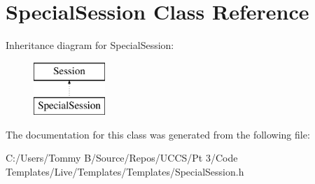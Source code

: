 \hypertarget{class_special_session}{}\section{Special\+Session Class Reference}
\label{class_special_session}
Inheritance diagram for Special\+Session\+:\begin{figure}[H]
\begin{center}
\leavevmode
\includegraphics[height=2.000000cm]{class_special_session}
\end{center}
\end{figure}


The documentation for this class was generated from the following file\+:\begin{DoxyCompactItemize}
\item 
C\+:/\+Users/\+Tommy B/\+Source/\+Repos/\+U\+C\+C\+S/\+Pt 3/\+Code Templates/\+Live/\+Templates/\+Templates/Special\+Session.\+h\end{DoxyCompactItemize}
